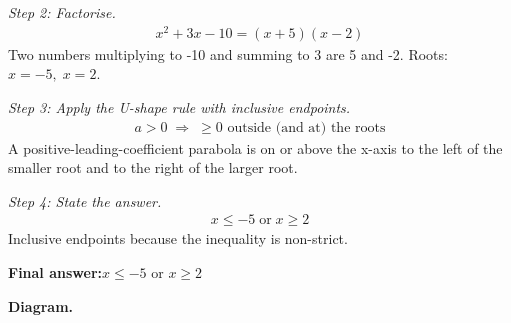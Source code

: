 \documentclass[11pt]{article}
\begin{document}
\textit{Step 2: Factorise.}
\[\begin{gathered}
x^2 + 3x - 10 = (x + 5)(x - 2)
\end{gathered}\]
Two numbers multiplying to -10 and summing to 3 are 5 and -2. Roots: \( x = -5, \; x = 2 \).

\textit{Step 3: Apply the U-shape rule with inclusive endpoints.}
\[\begin{gathered}
a > 0 \;\Longrightarrow\; \geq 0 \text{ outside (and at) the roots}
\end{gathered}\]
A positive-leading-coefficient parabola is on or above the x-axis to the left of the smaller root and to the right of the larger root.

\textit{Step 4: State the answer.}
\[\begin{gathered}
x \leq -5 \;\text{or}\; x \geq 2
\end{gathered}\]
Inclusive endpoints because the inequality is non-strict.

\begin{answerbox}
\textbf{Final answer:}\quad \(\displaystyle x \leq -5\) or \(\displaystyle x \geq 2\)
\end{answerbox}
\textbf{Diagram.}
\end{document}
